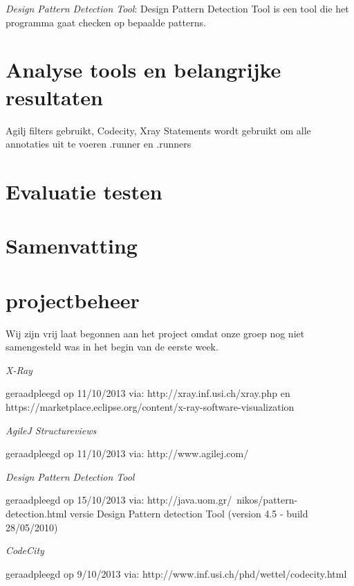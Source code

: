 \documentclass[a4paper, 11pt]{article}
\begin{document}
\begin{description}
\item \emph{Design Pattern Detection Tool}: Design Pattern Detection Tool is een tool die het programma gaat checken op bepaalde patterns.




\end{description}


\section{Analyse tools en belangrijke resultaten}
Agilj filters gebruikt, Codecity, Xray
Statements wordt gebruikt om alle annotaties uit te voeren
.runner en .runners

\section{Evaluatie testen}

\section{Samenvatting}

\section{projectbeheer}

Wij zijn vrij laat begonnen aan het project omdat onze groep nog niet samengesteld was in het begin van de eerste week. 


\newpage
\begin{flushleft}
\begin{thebibliography}{4}

\emph{X-Ray}
\begin{scriptsize}
geraadpleegd op 11/10/2013 via: \mbox{http://xray.inf.usi.ch/xray.php} en \mbox{https://marketplace.eclipse.org/content/x-ray-software-visualization}
\end{scriptsize}

\emph{AgileJ Structureviews}
\begin{scriptsize}
geraadpleegd op 11/10/2013 via: \mbox{http://www.agilej.com/}
\end{scriptsize}

\emph{Design Pattern Detection Tool}
\begin{scriptsize}
geraadpleegd op 15/10/2013 via: \mbox{http://java.uom.gr/~nikos/pattern-detection.html} versie  Design Pattern detection Tool (version 4.5 - build 28/05/2010)
\end{scriptsize}

\emph{CodeCity}
\begin{scriptsize}
geraadpleegd op 9/10/2013 via: \mbox{http://www.inf.usi.ch/phd/wettel/codecity.html} 
\end{scriptsize}

\end{thebibliography}
\end{flushleft}
\end{document}
